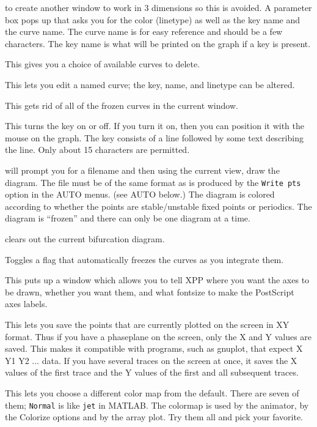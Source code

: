 \documentclass{article}
\begin{document}
\begin{description}
\begin{description}
\begin{description}
to create another window to work in 3 dimensions so this is avoided.
 A parameter box
pops up that asks you for the color (linetype) as well as the key name
and the curve name.  The curve name is for easy reference and should
be a few characters.  The key name is what will be printed on the
graph if a key is present.
\item[(D)elete]  This gives you a choice of available curves to
delete.
\item[(E)dit] This lets you edit a named curve; the key, name, and
linetype can be altered.   
\item[(R)emove all]  This gets rid of all of the frozen curves in the
current window.
\item[(K)ey] This turns the key on or off.  If you turn it on, then
you can position it with the mouse on the graph.  The key consists of
a line followed by some text describing the line.  Only about 15
characters are permitted.
\item[(B)if.diag] will prompt you for a filename and then using the
current view, draw the diagram. The file must be of the same format as
is produced by the {\tt Write pts} option in the AUTO menus. (see AUTO
below.)  The diagram is colored according to whether the points are
stable/unstable fixed points or periodics. The diagram is ``frozen''
and there can only be one diagram at a time.  
\item[(C)lr. BD] clears out the current bifurcation diagram.
\item[(O)n freeze] Toggles a flag that automatically freezes the
curves as you integrate them.
\end{description}
\item[a(X)es opts]  This puts up a window which allows you to tell XPP
where you want the axes to be drawn, whether you want them, and what
fontsize to make the PostScript axes labels.  
\item[exp(O)rt]  This lets you save the points that are currently
plotted on the screen in XY format. Thus if you have a phaseplane on
the screen, only the X and Y values are saved. This makes it
compatible with programs, such as gnuplot, that expect X Y1 Y2 ... data. If
you have several traces on the screen at once, it saves the X values
of the first trace and the Y values of the first and all subsequent
traces.
\item[(C)olormap] This lets you choose a different color map from the
default.  There are seven of them; {\tt Normal} is like {\tt jet} in MATLAB.  The colormap is used by the
animator, by the Colorize options and by the array plot.  Try them all and pick your
favorite. 


\end{description}
\end{description}
\end{document}
